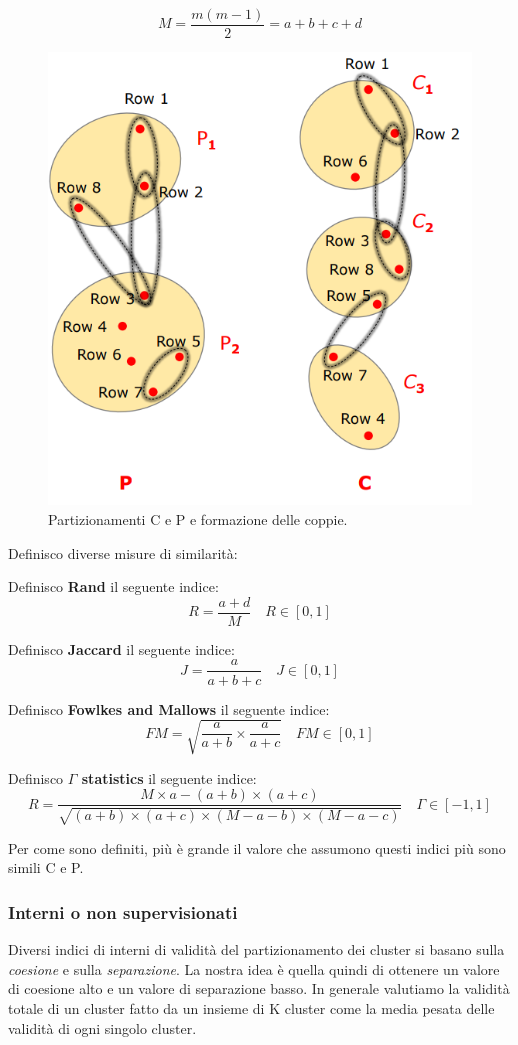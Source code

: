\[M =  \frac{m(m-1)}{2} =  a+b+c+d\]

\begin{figure}[H]
	\centering
	\includegraphics[height=0.40 \linewidth]{clustering/pict/partizionamenti.png}
	\caption{Partizionamenti C e P e formazione delle coppie.}
\end{figure}

Definisco diverse misure di similarità:

	 \begin{defn}
		Definisco \textbf{Rand} il seguente indice:
		 \[R = \frac{a + d}{M} \quad R \in [0,1]\]
			\end{defn}
		\begin{defn}
			Definisco \textbf{Jaccard} il seguente indice:
			\[J = \frac{a}{a + b + c} \quad J \in [0,1]\]
		\end{defn}
		\begin{defn}
			Definisco \textbf{Fowlkes and Mallows} il seguente indice:
			\[FM = \sqrt{\frac{a}{a + b} \times \frac{a}{a + c}} \quad FM \in [0,1]\]
		\end{defn}
		 \begin{defn}
			Definisco \textbf{$\Gamma$ statistics} il seguente indice:
			\[R = \frac{M \times a - (a+b)\times (a+c)}{\sqrt{(a+b)\times (a+c)\times(M-a-b)\times(M-a-c)}} \quad \Gamma \in [-1,1]\]
		\end{defn}	

Per come sono definiti, più è grande il valore che assumono questi indici più sono simili C e P.
\subsubsection{Interni o non supervisionati}
Diversi indici di interni di validità del partizionamento dei cluster si basano sulla \textit{coesione} e sulla \textit{separazione}. La nostra idea è quella quindi di ottenere un valore di coesione alto e un valore di separazione basso.
In generale valutiamo la validità totale di un cluster fatto da un insieme di K cluster come la media pesata delle validità di ogni singolo cluster.

